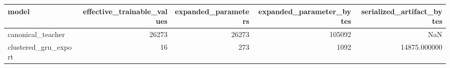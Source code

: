 \begin{tabular}{lrrrr}
\toprule
model & effective\_trainable\_values & expanded\_parameters & expanded\_parameter\_bytes & serialized\_artifact\_bytes \\
\midrule
canonical\_teacher & 26273 & 26273 & 105092 & NaN \\
clustered\_gru\_export & 16 & 273 & 1092 & 14875.000000 \\
\bottomrule
\end{tabular}
